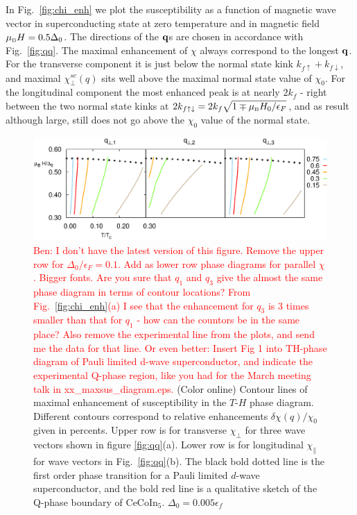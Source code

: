 \documentclass[aps,prl,twocolumn,showpacs,amsmath,amssymb]{revtex4-1}
\newcommand{\red}{\textcolor{red}}
\begin{document}
In Fig.~\ref{fig:chi_enh} we plot the susceptibility as a function of magnetic wave vector 
in superconducting state at zero temperature and in 
magnetic field $\mu_{\mbox{\tiny B}} H = 0.5\Delta_0$. 
The directions of the ${\bf q}$s are chosen in accordance with Fig.~\ref{fig:qq}.  
The maximal enhancement of $\chi$ always correspond to the longest ${\bf q}$. 
For the transverse component it is just below the normal state kink $k_{f\uparrow}+k_{f\downarrow}$, 
and maximal $\chi^{sc}_\perp(q)$ sits well above the maximal normal state value of $\chi_0$. 
For the longitudinal component the most enhanced peak is at nearly $2k_f$ - right between the two 
normal state kinks at $2k_{f\uparrow\downarrow} = 2k_f \sqrt{1\mp \mu_{\mbox{\tiny B}}H_0/\epsilon_F}$, 
and as result although large, still does not go above the $\chi_0$ value of the 
normal state. 


\begin{figure}[t]
\includegraphics[width=0.95\linewidth]{Fig4.eps}
\caption{ 
	\label{fig:ph.d} 
	\red{Ben: I don't have the latest version of this figure. 
	Remove the upper row for $\Delta_0/\epsilon_F=0.1$. 
	Add as lower row phase diagrams for parallel $\chi$.
	Bigger fonts. 
	Are you sure that $q_1$ and $q_3$ give the almost the same phase diagram in terms of 
	contour locations? From Fig.~\ref{fig:chi_enh}(a) I see that the enhancement for 
	$q_3$ is 3 times smaller than that for $q_1$ - how can the countors be in the same place?
	Also remove the experimental line from the plots, and send me the data for that line. 
	Or even better: Insert Fig 1 into TH-phase diagram of Pauli limited d-wave 
	superconductor, and indicate the experimental Q-phase region, like you had for the 
	March meeting talk in xx\_maxsus\_diagram.eps. 
	} 
	(Color online) 
	Contour lines of maximal enhancement of susceptibility in the $T$-$H$ 
	phase diagram. Different contours correspond to relative enhancements 
	$\delta\chi(q)/\chi_0$ given in percents. 
	Upper row is for transverse $\chi_\perp$ for three wave vectors shown in figure \ref{fig:qq}(a). 
	Lower row is for longitudinal $\chi_\parallel$ for wave vectors in Fig.~\ref{fig:qq}(b). 
	The black bold dotted line is the first order phase transition
	for a Pauli limited $d$-wave superconductor, and the bold red line is a
	qualitative sketch of the Q-phase boundary of CeCoIn$_5$.  $\Delta_0 =
	0.005\epsilon_f$ 
}
\end{figure}
 
\end{document}
